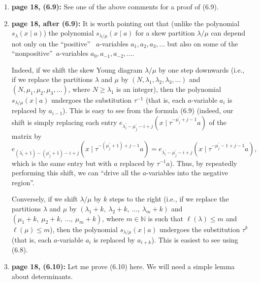 \documentclass[numbers=enddot,12pt,final,onecolumn,notitlepage]{scrartcl}%
\theoremstyle{definition}
\begin{document}
\begin{enumerate}
\item \textbf{page 18, (6.9):} See one of the above comments for a proof of (6.9).

\item \textbf{page 18, after (6.9):} It is worth pointing out that (unlike the
polynomial $s_{\lambda}\left(  x\mid a\right)  $) the polynomial
$s_{\lambda/\mu}\left(  x\mid a\right)  $ for a skew partition $\lambda/\mu$
can depend not only on the \textquotedblleft positive\textquotedblright%
\ $a$-variables $a_{1},a_{2},a_{3},\ldots$ but also on some of the
\textquotedblleft nonpositive\textquotedblright\ $a$-variables $a_{0}%
,a_{-1},a_{-2},\ldots$.

Indeed, if we shift the skew Young diagram $\lambda/\mu$ by one step downwards
(i.e., if we replace the partitions $\lambda$ and $\mu$ by $\left(
N,\lambda_{1},\lambda_{2},\lambda_{3},\ldots\right)  $ and $\left(  N,\mu
_{1},\mu_{2},\mu_{3},\ldots\right)  $, where $N\geq\lambda_{1}$ is an
integer), then the polynomial $s_{\lambda/\mu}\left(  x\mid a\right)  $
undergoes the substitution $\tau^{-1}$ (that is, each $a$-variable $a_{i}$ is
replaced by $a_{i-1}$). This is easy to see from the formula (6.9) (indeed,
our shift is simply replacing each entry $e_{\lambda_{i}^{\prime}-\mu
_{j}^{\prime}-i+j}\left(  x\mid\tau^{-\mu_{j}^{\prime}+j-1}a\right)  $ of the
matrix by
\[
e_{\left(  \lambda_{i}^{\prime}+1\right)  -\left(  \mu_{j}^{\prime}+1\right)
-i+j}\left(  x\mid\tau^{-\left(  \mu_{j}^{\prime}+1\right)  +j-1}a\right)
=e_{\lambda_{i}^{\prime}-\mu_{j}^{\prime}-i+j}\left(  x\mid\tau^{-\mu
_{j}^{\prime}-1+j-1}a\right)  ,
\]
which is the same entry but with $a$ replaced by $\tau^{-1}a$). Thus, by
repeatedly performing this shift, we can \textquotedblleft drive all the
$a$-variables into the negative region\textquotedblright.

Conversely, if we shift $\lambda/\mu$ by $k$ steps to the right (i.e., if we
replace the partitions $\lambda$ and $\mu$ by $\left(  \lambda_{1}%
+k,\ \lambda_{2}+k,\ \ldots,\ \lambda_{m}+k\right)  $ and $\left(  \mu
_{1}+k,\ \mu_{2}+k,\ \ldots,\ \mu_{m}+k\right)  $, where $m\in\mathbb{N}$ is
such that $\ell\left(  \lambda\right)  \leq m$ and $\ell\left(  \mu\right)
\leq m$), then the polynomial $s_{\lambda/\mu}\left(  x\mid a\right)  $
undergoes the substitution $\tau^{k}$ (that is, each $a$-variable $a_{i}$ is
replaced by $a_{i+k}$). This is easiest to see using (6.8).

\item \textbf{page 18, (6.10):} Let me prove (6.10) here. We will need a
simple lemma about determinants.


\end{enumerate}
\end{document}
